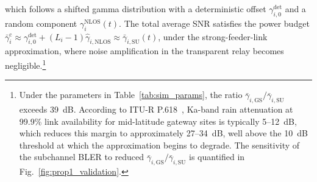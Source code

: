 \documentclass[journal]{IEEEtran}
\begin{document}
which follows a shifted gamma distribution with a deterministic offset $\gamma_{i,0}^{\mathrm{det}}$ and a random component $\gamma_i^{\mathrm{NLOS}}(t)$. The total average SNR satisfies the power budget
$\bar{\gamma}_i^{\mathrm{c}} \approx \gamma_{i,0}^{\mathrm{det}} + (L_i-1)\hat{\gamma}_{i,\mathrm{NLOS}} \approx \bar{\gamma}_{i,\mathrm{SU}}(t)$,
under the strong-feeder-link approximation, where noise amplification in the transparent relay becomes negligible.\footnote{Under the parameters in Table~\ref{tab:sim_params}, the ratio $\bar{\gamma}_{i,\mathrm{GS}}/\bar{\gamma}_{i,\mathrm{SU}}$ exceeds 39~dB. According to ITU-R P.618~\cite{ITU-R_P618-14}, Ka-band rain attenuation at 99.9\% link availability for mid-latitude gateway sites is typically 5--12~dB, which reduces this margin to approximately 27--34~dB, well above the 10~dB threshold at which the approximation begins to degrade. The sensitivity of the subchannel BLER to reduced $\bar{\gamma}_{i,\mathrm{GS}}/\bar{\gamma}_{i,\mathrm{SU}}$ is quantified in Fig.~\ref{fig:prop1_validation}.}
\end{document}
